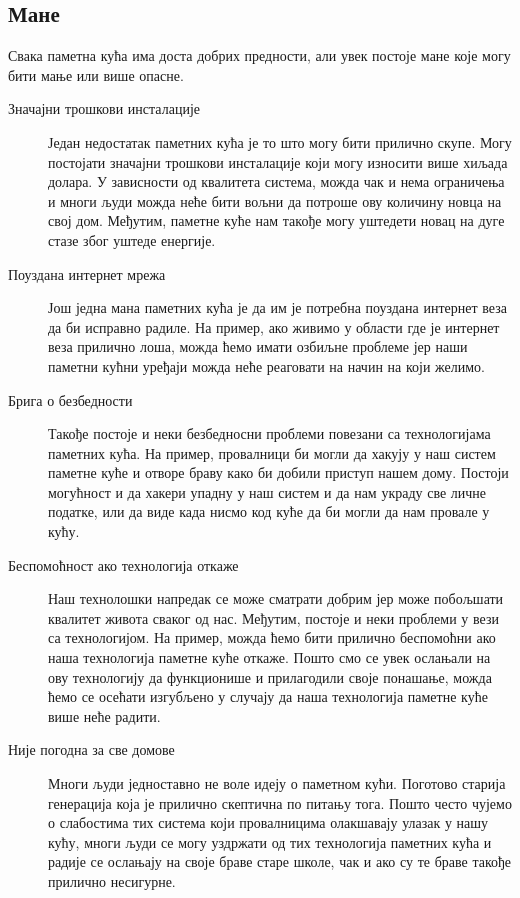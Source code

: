 \documentclass[a4paper]{article}
\begin{document}
\subsection{Мане}
Свака паметна кућа има доста добрих предности, али увек постоје мане које могу бити мање или више опасне.
\newline\newline
\begin{description}
    \item[Значајни трошкови инсталације]
    Један недостатак паметних кућа је то што могу бити прилично скупе.  Могу постојати значајни трошкови инсталације који могу износити више хиљада долара.
    У зависности од квалитета система, можда чак и нема ограничења и многи људи можда неће бити вољни да потроше ову количину новца на свој дом.
    Међутим, паметне куће нам такође могу уштедети новац на дуге стазе због уштеде енергије.
    \item[Поуздана интернет мрежа]
    Још једна мана паметних кућа је да им је потребна поуздана интернет веза да би исправно радиле. На пример, ако живимо у области где је интернет веза
    прилично лоша, можда ћемо имати озбиљне проблеме јер наши паметни кућни уређаји можда неће реаговати на начин на који желимо.
    \item[Брига о безбедности]
    Такође постоје и неки безбедносни проблеми повезани са технологијама паметних кућа. На пример, провалници би могли да хакују у наш систем паметне куће
    и отворе браву како би добили приступ нашем дому. Постоји могућност и да хакери упадну у наш систем и да нам украду све личне податке, или да виде када нисмо
    код куће да би могли да нам провале у кућу.
    \item[Беспомоћност ако технологија откаже]
    Наш технолошки напредак се може сматрати добрим јер може побољшати квалитет живота сваког од нас. Међутим, постоје и неки проблеми у вези са технологијом.
    На пример, можда ћемо бити прилично беспомоћни ако наша технологија паметне куће откаже. Пошто смо се увек ослањали на ову технологију да функционише
    и прилагодили своје понашање, можда ћемо се осећати изгубљено у случају да наша технологија паметне куће више неће радити.
    \item[Није погодна за све домове]
    Многи људи једноставно не воле идеју о паметном кући. Поготово старија генерација која је прилично скептична по питању тога. Пошто често чујемо
    о слабостима тих система који провалницима олакшавају улазак у нашу кућу, многи људи се могу уздржати од тих технологија паметних кућа и
    радије се ослањају на своје браве старе школе, чак и ако су те браве такође прилично несигурне.
\end{description}
\end{document}
